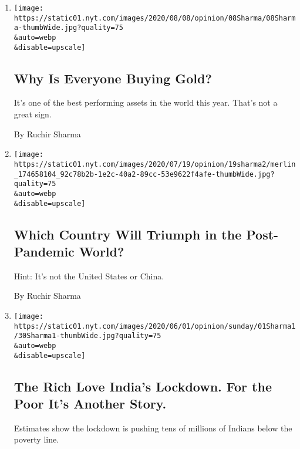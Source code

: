 \begin{enumerate}
\def\labelenumi{\arabic{enumi}.}
\item
  \href{/2020/08/08/opinion/gold-investment-coronavirus.html}{}

  \texttt{[image: https://static01.nyt.com/images/2020/08/08/opinion/08Sharma/08Sharma-thumbWide.jpg?quality=75\\\&auto=webp\\\&disable=upscale]}

  \hypertarget{why-is-everyone-buying-gold}{%
  \subsection{Why Is Everyone Buying
  Gold?}\label{why-is-everyone-buying-gold}}

  It's one of the best performing assets in the world this year. That's
  not a great sign.

  By Ruchir Sharma
\item
  \href{/2020/07/19/opinion/coronavirus-germany-economy.html}{}

  \texttt{[image: https://static01.nyt.com/images/2020/07/19/opinion/19sharma2/merlin\_174658104\_92c78b2b-1e2c-40a2-89cc-53e9622f4afe-thumbWide.jpg?quality=75\\\&auto=webp\\\&disable=upscale]}

  \hypertarget{which-country-will-triumph-in-the-post-pandemic-world}{%
  \subsection{Which Country Will Triumph in the Post-Pandemic
  World?}\label{which-country-will-triumph-in-the-post-pandemic-world}}

  Hint: It's not the United States or China.

  By Ruchir Sharma
\item
  \href{/2020/05/30/opinion/sunday/india-coronavirus-lockdown-inequality.html}{}

  \texttt{[image: https://static01.nyt.com/images/2020/06/01/opinion/sunday/01Sharma1/30Sharma1-thumbWide.jpg?quality=75\\\&auto=webp\\\&disable=upscale]}

  \hypertarget{the-rich-love-indias-lockdown-for-the-poor-its-another-story}{%
  \subsection{The Rich Love India's Lockdown. For the Poor It's Another
  Story.}\label{the-rich-love-indias-lockdown-for-the-poor-its-another-story}}

  Estimates show the lockdown is pushing tens of millions of Indians
  below the poverty line.


\end{enumerate}
